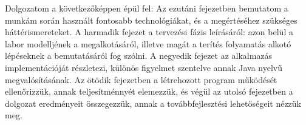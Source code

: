 Dolgozatom a következőképpen épül fel:
Az ezutáni fejezetben bemutatom a munkám során használt fontosabb technológiákat, és a megértéséhez szükséges háttérismereteket. A harmadik fejezet a tervezési fázis leírásáról: azon belül a labor modelljének a megalkotásáról, illetve magát a terítés folyamatás alkotó lépéseknek a bemutatásáról fog szólni. A negyedik fejezet az alkalmazás implementációját részletezi, különös figyelmet szentelve annak Java nyelvű megvalósításának. Az ötödik fejezetben a létrehozott program működését ellenőrizzük, annak teljesítménnyét elemezzük, és végül az utolsó fejezetben a dolgozat eredményeit összegezzük, annak a továbbfejlesztési lehetőségeit nézzük meg.
